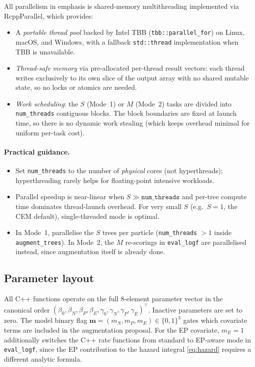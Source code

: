 \documentclass[12pt,a4paper]{article}
\begin{document}
All parallelism in \textsf{emphasis} is shared-memory multithreading
implemented via \textsf{RcppParallel}, which provides:
\begin{itemize}
  \item A \emph{portable thread pool} backed by Intel TBB
    (\texttt{tbb::parallel\_for}) on Linux, macOS, and Windows, with a
    fallback \texttt{std::thread} implementation when TBB is unavailable.
  \item \emph{Thread-safe memory} via pre-allocated per-thread result
    vectors: each thread writes exclusively to its own slice of the output
    array with no shared mutable state, so no locks or atomics are needed.
  \item \emph{Work scheduling}: the $S$ (Mode~1) or $M$ (Mode~2) tasks
    are divided into \texttt{num\_threads} contiguous blocks. The block
    boundaries are fixed at launch time, so there is no dynamic work
    stealing (which keeps overhead minimal for uniform per-task cost).
\end{itemize}

\paragraph{Practical guidance.}
\begin{itemize}
  \item Set \texttt{num\_threads} to the number of \emph{physical} cores
    (not hyperthreads); hyperthreading rarely helps for floating-point
    intensive workloads.
  \item Parallel speedup is near-linear when $S \gg \texttt{num\_threads}$
    and per-tree compute time dominates thread-launch overhead. For very
    small $S$ (e.g.\ $S=1$, the CEM default), single-threaded mode is
    optimal.
  \item In Mode~1, parallelise the $S$ trees per particle
    (\texttt{num\_threads} $> 1$ inside \texttt{augment\_trees}).
    In Mode~2, the $M$ re-scorings in \texttt{eval\_logf} are parallelised
    instead, since augmentation itself is already done.
\end{itemize}

\subsection{Parameter layout}

All C++ functions operate on the full 8-element parameter vector in the
canonical order
$(\beta_0, \beta_N, \beta_P, \beta_E, \gamma_0, \gamma_N, \gamma_P,
\gamma_E)^\top$.
Inactive parameters are set to zero. The model binary flag
$\mathbf{m} = (m_N, m_P, m_E) \in \{0,1\}^3$ gates which covariate terms
are included in the augmentation proposal. For the EP covariate, $m_E = 1$
additionally switches the C++ rate functions from standard to EP-aware
mode in \texttt{eval\_logf}, since the EP contribution to the hazard
integral \eqref{eq:hazard} requires a different analytic formula.
\end{document}

